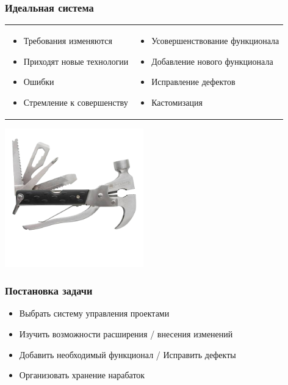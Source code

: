 \documentclass[unicode]{beamer}
\begin{document}
\begin{frame}
\transwipe[direction=90]
\frametitle{Идеальная система}
\begin{tabular}{ >{\centering\arraybackslash}m{}  >{\centering\arraybackslash}m{} }
\begin{minipage}{5cm}
\begin{block}{}
\fontsize{10pt}{12pt}
\begin{itemize}
  \item Требования изменяются
  \item Приходят новые технологии
  \item Ошибки
  \item Стремление к совершенству
\end{itemize}
\end{block}
\end{minipage}&
\begin{minipage}{6cm}
\begin{block}{}
\fontsize{10pt}{12pt}
\begin{itemize}
  \item Усовершенствование функционала
  \item Добавление нового функционала
  \item Исправление дефектов
  \item Кастомизация
\end{itemize}
\end{block}
\end{minipage}\\
\end{tabular}
\hspace{1cm}
\centerline{\includegraphics[width=6cm]{super-hammer.png}}
\end{frame}

\begin{frame}
\transwipe[direction=90]
\frametitle{Постановка задачи}
\begin{block}{}
\begin{itemize}
  \item Выбрать систему управления проектами
  \item Изучить возможности расширения / внесения изменений
  \item Добавить необходимый функционал  / Исправить дефекты
  \item Организовать хранение нарабаток
\end{itemize}
\end{block}
\end{frame}
\end{document}
